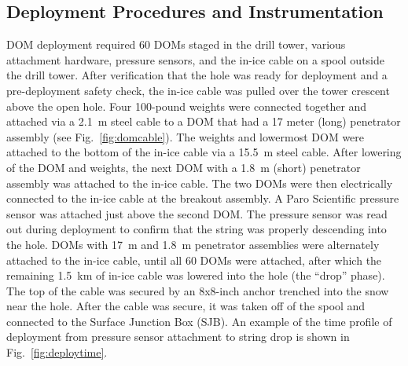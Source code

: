 
\subsection{\label{sec:deployment_inst}Deployment Procedures and Instrumentation}

DOM deployment required 60 DOMs staged in the drill tower, various
attachment hardware, pressure sensors, and the in-ice cable on a spool
outside the drill tower. After verification that the hole was 
ready for deployment and a pre-deployment safety check, the in-ice cable
was pulled over the tower crescent above the open hole. Four 100-pound
weights were connected together and attached via a 2.1~m steel cable to a
DOM that had a 17 meter (long) penetrator assembly (see Fig.~\ref{fig:domcable}). The weights and
lowermost DOM were attached to the bottom of the in-ice cable via a 15.5~m
steel cable. After lowering of the DOM and weights, the next DOM with a
1.8~m (short) penetrator assembly was attached to the in-ice cable. The two DOMs were
then electrically connected to the in-ice cable at the breakout assembly. A
Paro Scientific pressure sensor was attached just above the second DOM. The
pressure sensor was read out during deployment to confirm that the string
was properly descending into the hole.   DOMs with 17~m and
1.8~m penetrator assemblies were alternately attached to the in-ice 
cable, until all 60 DOMs were attached, after which the remaining 1.5~km of
in-ice cable was lowered into the hole (the ``drop'' phase). The top of the
cable was secured by an 8x8-inch anchor trenched into the snow near the hole. After the
cable was secure, it was taken off of the spool and connected to the
Surface Junction Box (SJB). An example of the time profile of deployment from pressure sensor
attachment to string drop is shown in Fig.~\ref{fig:deploytime}.

